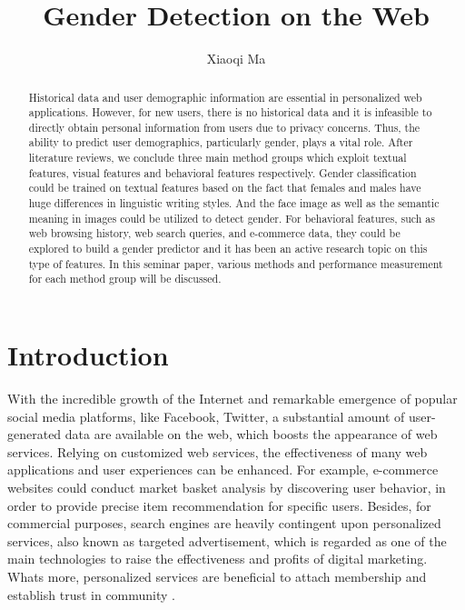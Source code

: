 \documentclass[runningheads]{llncs}
\begin{document}
	
	\title{Gender Detection on the Web}
	\author{Xiaoqi Ma}
	\maketitle  
	
	\begin{abstract}
		
		Historical data and user demographic information are essential in personalized web applications. However, for new users, there is no historical data and it is infeasible to directly obtain personal information from users due to privacy concerns. Thus, the ability to predict user demographics, particularly gender, plays a vital role. After literature reviews, we conclude three main method groups which exploit textual features, visual features and behavioral features respectively. Gender classification could be trained on textual features based on the fact that females and males have huge differences in linguistic writing styles. And the face image as well as the semantic meaning in images could be utilized to detect gender. For behavioral features, such as web browsing history, web search queries, and e-commerce data, they could be explored to build a gender predictor and it has been an active research topic on this type of features. In this seminar paper, various methods and performance measurement for each method group will be discussed.
		
	\end{abstract}
	
	\section{Introduction}
	
	With the incredible growth of the Internet and remarkable emergence of popular social media platforms, like Facebook, Twitter, a substantial amount of user-generated data are available on the web, which boosts the appearance of web services. Relying on customized web services, the effectiveness of many web applications and user experiences can be enhanced. For example, e-commerce websites could conduct market basket analysis by discovering user behavior, in order to provide precise item recommendation for specific users. Besides, for commercial purposes, search engines are heavily contingent upon personalized services, also known as targeted advertisement, which is regarded as one of the main technologies to raise the effectiveness and profits of digital marketing. What\textquotesingle s more, personalized services are beneficial to attach membership and establish trust in community \cite{zhong2015you}.\\
	
\end{document}
